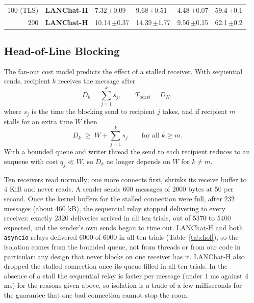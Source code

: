 \documentclass[conference]{IEEEtran}
\newcommand{\code}[1]{\texttt{#1}}
\begin{document}
\begin{table}[t]
\begin{tabularx}{0.82\textwidth}{@{}r l Y Y Y Y@{}}
100 (TLS) & \textbf{LANChat-H} & 7.32{\,\scriptsize$\pm$0.09} & 9.68{\,\scriptsize$\pm$0.51} & 4.48{\,\scriptsize$\pm$0.07} & 59.4{\,\scriptsize$\pm$0.1} \\
200 & \textbf{LANChat-H} & 10.14{\,\scriptsize$\pm$0.37} & 14.39{\,\scriptsize$\pm$1.77} & 9.56{\,\scriptsize$\pm$0.15} & 62.1{\,\scriptsize$\pm$0.2} \\
\bottomrule
\end{tabularx}
\end{table}

\subsection{Head-of-Line Blocking}
The fan-out cost model predicts the effect of a stalled receiver. With sequential sends, recipient $k$ receives the message after
\begin{equation}
D_k = \sum_{j=1}^{k} s_j , \qquad T_{\text{bcast}} = D_N ,
\end{equation}
where $s_j$ is the time the blocking send to recipient $j$ takes, and if recipient $m$ stalls for an extra time $W$ then
\begin{equation}
D_k \;\ge\; W + \sum_{j=1}^{k} s_j \qquad \text{for all } k \ge m .
\end{equation}
With a bounded queue and writer thread the send to each recipient reduces to an enqueue with cost $q_j \ll W$, so $D_k$ no longer depends on $W$ for $k \neq m$.

Ten receivers read normally; one more connects first, shrinks its receive buffer to 4 KiB and never reads. A sender sends 600 messages of 2000 bytes at 50 per second. Once the kernel buffers for the stalled connection were full, after 232 messages (about 460 kB), the sequential relay stopped delivering to every receiver: exactly 2320 deliveries arrived in all ten trials, out of 5370 to 5400 expected, and the sender's own sends began to time out. LANChat-H and both \code{asyncio} relays delivered 6000 of 6000 in all ten trials (Table~\ref{tab:hol}), so the isolation comes from the bounded queue, not from threads or from our code in particular: any design that never blocks on one receiver has it. LANChat-H also dropped the stalled connection once its queue filled in all ten trials. In the absence of a stall the sequential relay is faster per message (under 1 ms against 4 ms) for the reasons given above, so isolation is a trade of a few milliseconds for the guarantee that one bad connection cannot stop the room.
\end{document}

